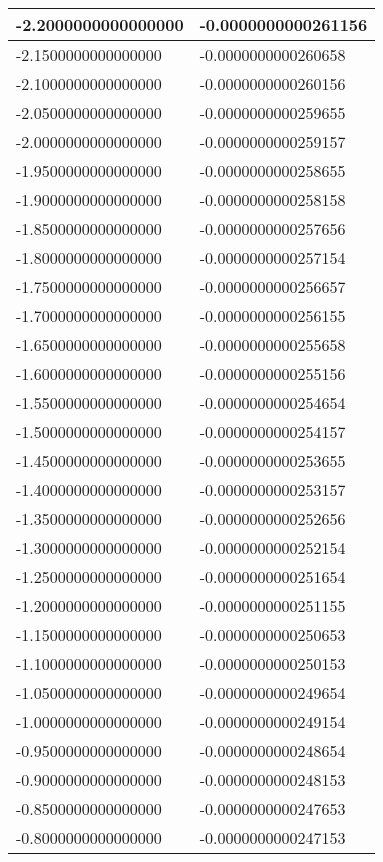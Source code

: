\documentclass[a4paper,14pt]{article}
\begin{document}
\begin{longtable}{|l|l|}
-2.2000000000000000	&	-0.0000000000261156\\ \hline
-2.1500000000000000	&	-0.0000000000260658\\ \hline
-2.1000000000000000	&	-0.0000000000260156\\ \hline
-2.0500000000000000	&	-0.0000000000259655\\ \hline
-2.0000000000000000	&	-0.0000000000259157\\ \hline
-1.9500000000000000	&	-0.0000000000258655\\ \hline
-1.9000000000000000	&	-0.0000000000258158\\ \hline
-1.8500000000000000	&	-0.0000000000257656\\ \hline
-1.8000000000000000	&	-0.0000000000257154\\ \hline
-1.7500000000000000	&	-0.0000000000256657\\ \hline
-1.7000000000000000	&	-0.0000000000256155\\ \hline
-1.6500000000000000	&	-0.0000000000255658\\ \hline
-1.6000000000000000	&	-0.0000000000255156\\ \hline
-1.5500000000000000	&	-0.0000000000254654\\ \hline
-1.5000000000000000	&	-0.0000000000254157\\ \hline
-1.4500000000000000	&	-0.0000000000253655\\ \hline
-1.4000000000000000	&	-0.0000000000253157\\ \hline
-1.3500000000000000	&	-0.0000000000252656\\ \hline
-1.3000000000000000	&	-0.0000000000252154\\ \hline
-1.2500000000000000	&	-0.0000000000251654\\ \hline
-1.2000000000000000	&	-0.0000000000251155\\ \hline
-1.1500000000000000	&	-0.0000000000250653\\ \hline
-1.1000000000000000	&	-0.0000000000250153\\ \hline
-1.0500000000000000	&	-0.0000000000249654\\ \hline
-1.0000000000000000	&	-0.0000000000249154\\ \hline
-0.9500000000000000	&	-0.0000000000248654\\ \hline
-0.9000000000000000	&	-0.0000000000248153\\ \hline
-0.8500000000000000	&	-0.0000000000247653\\ \hline
-0.8000000000000000	&	-0.0000000000247153\\ \hline

\end{longtable}
\end{document}

